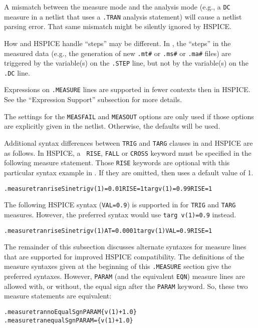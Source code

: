\begin{XyceItemize}
  \item A mismatch between the measure mode and the analysis mode
        (e.g., a {\tt DC} measure in a netlist that uses a {\tt .TRAN}
        analysis statement) will cause a \Xyce{} netlist parsing
        error.  That same mismatch might be silently ignored by
        HSPICE.

  \item How \Xyce{} and HSPICE handle ``steps'' may be different.
        In \Xyce{}, the ``steps'' in the measured data (e.g., the
        generation of new \texttt{.mt\#} or \texttt{.ms\#}
        or \texttt{.ma\#} files) are triggered by the variable(s) on
        the {\tt .STEP} line, but not by the variable(s) on the {\tt
        .DC} line.

  \item Expressions on \texttt{.MEASURE} lines are supported in fewer
        contexts then in HSPICE.  See the ``Expression Support''
        subsection for more details.

  \item The settings for the \texttt{MEASFAIL} and \texttt{MEASOUT}
        options are only used if those options are explicitly given in
        the netlist.  Otherwise, the \Xyce{} defaults will be used.
\end{XyceItemize}

Additional syntax differences between {\tt TRIG} and {\tt TARG}
clauses in \Xyce{} and HSPICE are as follows.  In HSPICE, a {\tt
RISE}, {\tt FALL} or {\tt CROSS} keyword must be specified in the
following measure statement.  Those {\tt RISE} keywords are optional
with this particular syntax example in \Xyce{}.  If they are omitted,
then \Xyce{} uses a default value of 1.
\begin{alltt}
.measure tran riseSine trig v(1)=0.01 RISE=1 targ v(1)=0.99 RISE=1
\end{alltt}
The following HSPICE syntax ({\tt VAL=0.9}) is supported in \Xyce{}
for {\tt TRIG} and {\tt TARG} measures. However, the preferred \Xyce{}
syntax would use {\tt targ v(1)=0.9} instead.
\begin{alltt}
.measure tran riseSine trig v(1) AT=0.0001 targ v(1) VAL=0.9 RISE=1
\end{alltt}

The remainder of this subsection discusses alternate syntaxes
for \Xyce{} measure lines that are supported for improved HSPICE
compatibility.  The definitions of the measure syntaxes given at the
beginning of this \texttt{.MEASURE} section give the preferred
\Xyce{} syntaxes.  However, \texttt{PARAM} (and the equivalent \texttt{EQN})
measure lines are allowed with, or without, the equal sign after
the \texttt{PARAM} keyword.  So, these two \Xyce{} measure statements
are equivalent:
\begin{alltt}
.measure tran noEqualSgn PARAM \{v(1)+1.0\}
.measure tran equalSgn PARAM=\{v(1)+1.0\}
\end{alltt}

